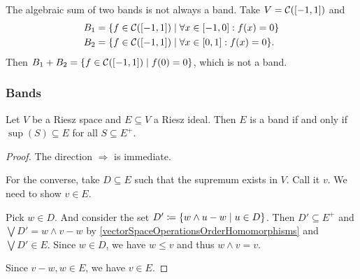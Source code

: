 \begin{example}
The algebraic sum of two bands is not always a band. Take $V = \cont(\interval{-1,1})$ and
\begin{align*}
B_1 &= \setbuilder{f\in\cont(\interval{-1,1})}{\forall x\in \interval{-1,0}: f(x) = 0} \\
B_2 &= \setbuilder{f\in\cont(\interval{-1,1})}{\forall x\in \interval{0,1}: f(x) = 0}.
\end{align*}
Then $B_1+B_2 = \setbuilder{f\in\cont(\interval{-1,1})}{f(0) = 0}$, which is not a band. 
\end{example}

\subsubsection{Bands}

\begin{proposition} \label{bandFromIdealByPositiveCone}
Let $V$ be a Riesz space and $E\subseteq V$ a Riesz ideal. Then $E$ is a band \textup{if and only if} $\sup(S) \subseteq E$ for all $S\subseteq E^+$.
\end{proposition}
\begin{proof}
The direction $\Rightarrow$ is immediate.

For the converse, take $D\subseteq E$ such that the supremum exists in $V$. Call it $v$. We need to show $v\in E$.

Pick $w\in D$. And consider the set $D' \defeq \setbuilder{w\wedge u - w}{u\in D}$. Then $D'\subseteq E^+$ and $\bigvee D' = w\wedge v - w$ by \ref{vectorSpaceOperationsOrderHomomorphisms} and $\bigvee D'\in E$. Since $w\in D$, we have $w\leq v$ and thus $w\wedge v = v$.

Since $v-w,w\in E$, we have $v\in E$.
\end{proof}

